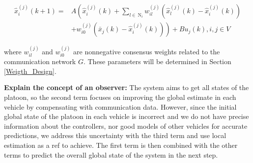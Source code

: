 \documentclass[letterpaper, 10pt, conference]{ieeeconf}  %
\begin{document}
\begin{equation}\label{dis_obs}
\begin{aligned}
\hat{x}_i^{(j)}(k+1)= & A\left(\hat{x}_i^{(j)}(k)+\sum_{l \in \mathrm{~N}_i} w_{i l}^{(j)}\left(\hat{x}_l^{(j)}(k)-\hat{x}_i^{(j)}(k)\right)\right. \\
& \left.+w_{i 0}^{(j)}\left(\bar{x}_j(k)-\hat{x}_i^{(j)}(k)\right)\right)+B u_j(k), i, j \in V
\end{aligned}
\end{equation}

where $w_{il}^{(j)}$ and
$w_{i0}^{(j)}$ are nonnegative consensus weights related to the communication
network $G$. These parameters will be determined in Section \ref{Weigth_Design}. 


\textbf{Explain the concept of an observer:} The system aims to get all states of the platoon, so the second term focuses on improving the global estimate in each vehicle by compensating with communication data. However, since the initial global state of the platoon in each vehicle is incorrect and we do not have precise information about the controllers, nor good models of other vehicles for accurate predictions, we address this uncertainty with the third term and use local estimation as a ref to achieve. The first term is then combined with the other terms to predict the overall global state of the system in the next step.



\end{document}

